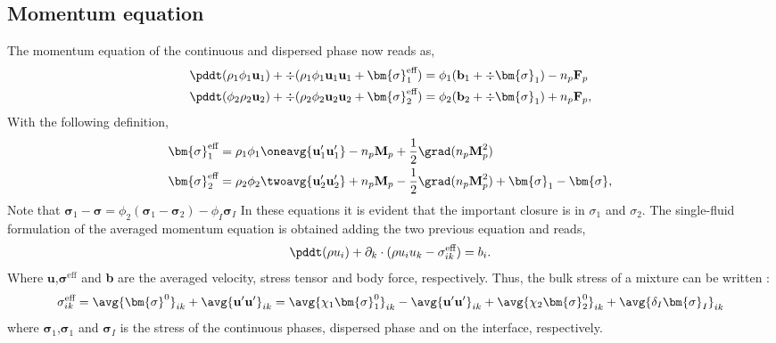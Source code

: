 \subsection{Momentum equation}
The momentum equation of the continuous and dispersed phase now reads as, 
\begin{align*}
    \pddt (\rho_1\phi_1 \textbf{u}_1 )
    + \div (\rho_1\phi_1 \textbf{u}_1  \textbf{u}_1
    + \bm{\sigma}^\text{eff}_1 )
    &= 
    \phi_1( \textbf{b}_1  +\div  \bm{\sigma}_1)
    - n_p\textbf{F}_p \\
    \pddt (\phi_2  \rho_2\textbf{u}_2)
    + \div (
        \rho_2\phi_2 \textbf{u}_2\textbf{u}_2
        + \bm{\sigma}^\text{eff}_2
        )
    &= 
     \phi_2 (
      \textbf{b}_2
    + \div \bm{\sigma}_1 )
    + n_p\textbf{F}_p ,
\end{align*}
With the following definition, 
\begin{align*}
    \bm{\sigma}^\text{eff}_1
    &=\rho_1 \phi_1 \oneavg{\textbf{u}_1'\textbf{u}_1'}
    - n_p\textbf{M}_p 
    + \frac{1}{2}\grad (n_p \textbf{M}_p^2)
    \\
    \bm{\sigma}^\text{eff}_2
    &= \rho_2\phi_2 \twoavg{ \textbf{u}_2'\textbf{u}_2'} 
    + n_p\textbf{M}_p 
    - \frac{1}{2}\grad (n_p \textbf{M}_p^2)
    +\bm{\sigma}_1 - \bm{\sigma},
\end{align*}
Note that  $\bm{\sigma}_1 - \bm{\sigma} =  \phi_2 (\bm{\sigma}_1  - \bm{\sigma}_2) - \phi_I \bm{\sigma}_I$
In these equations it is evident that the important closure is in $\sigma_1$ and $\sigma_2$.
The single-fluid formulation of the averaged momentum equation is obtained adding the two previous equation and reads,
\begin{equation}
    \pddt (\rho u_i)
    + \partial_k \cdot (\rho u_i u_k - \sigma_{ik}^\text{eff})
    = b_i. 
    \label{eq:dt_rho_u}
\end{equation}
Where $\textbf{u}$,$\bm{\sigma}^\text{eff}$ and \textbf{b} are the averaged velocity, stress tensor and body force, respectively. 
Thus, the bulk stress of a mixture can be written : 
\begin{equation}
    \sigma_{ik}^\text{eff}
    = \avg{\bm{\sigma}^0}_{ik}
    + \avg{\textbf{u}'\textbf{u}'}_{ik}
    = \avg{\chi_1 \bm{\sigma}^0_1}_{ik} 
    - \avg{\textbf{u}'\textbf{u}'}_{ik}
    +\avg{\chi_2 \bm{\sigma}^0_2}_{ik}
    + \avg{\delta_I \bm{\sigma}_I}_{ik}
    \label{eq:sigma}
\end{equation}
where $\bm{\sigma}_1$,$\bm{\sigma}_1$ and $\bm{\sigma}_I$  is the stress of the continuous phases, dispersed phase and on the interface, respectively.

